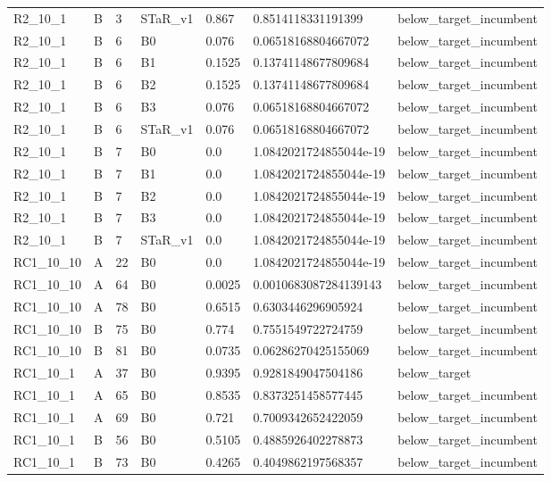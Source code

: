 \begin{tabular}{lllllll}
 R2\_10\_1 & B & 3 & STaR\_v1 & 0.867 & 0.8514118331191399 & below\_target\_incumbent \\
 R2\_10\_1 & B & 6 & B0 & 0.076 & 0.06518168804667072 & below\_target\_incumbent \\
 R2\_10\_1 & B & 6 & B1 & 0.1525 & 0.13741148677809684 & below\_target\_incumbent \\
 R2\_10\_1 & B & 6 & B2 & 0.1525 & 0.13741148677809684 & below\_target\_incumbent \\
 R2\_10\_1 & B & 6 & B3 & 0.076 & 0.06518168804667072 & below\_target\_incumbent \\
 R2\_10\_1 & B & 6 & STaR\_v1 & 0.076 & 0.06518168804667072 & below\_target\_incumbent \\
 R2\_10\_1 & B & 7 & B0 & 0.0 & 1.0842021724855044e-19 & below\_target\_incumbent \\
 R2\_10\_1 & B & 7 & B1 & 0.0 & 1.0842021724855044e-19 & below\_target\_incumbent \\
 R2\_10\_1 & B & 7 & B2 & 0.0 & 1.0842021724855044e-19 & below\_target\_incumbent \\
 R2\_10\_1 & B & 7 & B3 & 0.0 & 1.0842021724855044e-19 & below\_target\_incumbent \\
 R2\_10\_1 & B & 7 & STaR\_v1 & 0.0 & 1.0842021724855044e-19 & below\_target\_incumbent \\
 RC1\_10\_10 & A & 22 & B0 & 0.0 & 1.0842021724855044e-19 & below\_target\_incumbent \\
 RC1\_10\_10 & A & 64 & B0 & 0.0025 & 0.0010683087284139143 & below\_target\_incumbent \\
 RC1\_10\_10 & A & 78 & B0 & 0.6515 & 0.6303446296905924 & below\_target\_incumbent \\
 RC1\_10\_10 & B & 75 & B0 & 0.774 & 0.7551549722724759 & below\_target\_incumbent \\
 RC1\_10\_10 & B & 81 & B0 & 0.0735 & 0.06286270425155069 & below\_target\_incumbent \\
 RC1\_10\_1 & A & 37 & B0 & 0.9395 & 0.9281849047504186 & below\_target \\
 RC1\_10\_1 & A & 65 & B0 & 0.8535 & 0.8373251458577445 & below\_target\_incumbent \\
 RC1\_10\_1 & A & 69 & B0 & 0.721 & 0.7009342652422059 & below\_target\_incumbent \\
 RC1\_10\_1 & B & 56 & B0 & 0.5105 & 0.4885926402278873 & below\_target\_incumbent \\
 RC1\_10\_1 & B & 73 & B0 & 0.4265 & 0.4049862197568357 & below\_target\_incumbent \\

\end{tabular}
